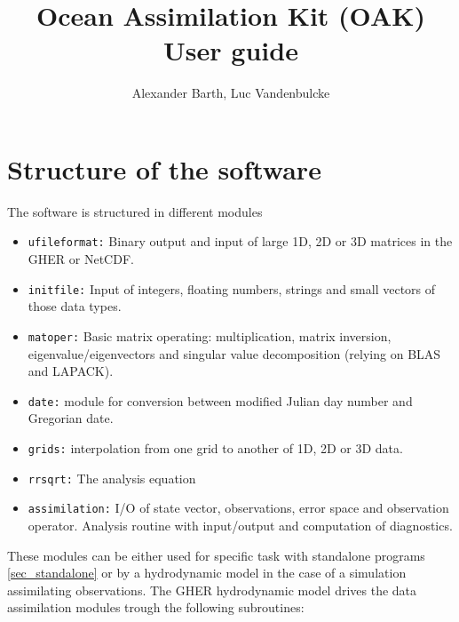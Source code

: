 \documentclass[a4paper,12pt]{article}
\newcommand{\code}{\texttt}
\begin{document}
\setlength{\parindent}{0cm}
\newcommand{\tabularcol}{|p{0.3\textwidth}|p{0.2\textwidth}|p{0.5\textwidth}|}

\title{Ocean Assimilation Kit (OAK) \\ User guide}
\author{Alexander Barth, Luc Vandenbulcke}
\maketitle



\section{Structure of the software}

The software is structured in different modules

\begin{itemize}

\item \code{ufileformat:} Binary output and input of large 1D, 2D or 3D
matrices in the GHER or NetCDF.
\item \code{initfile:} Input of integers, floating numbers, strings and small
vectors of those data types.
\item \code{matoper:} Basic matrix operating: multiplication, matrix
  inversion, eigenvalue/eigenvectors and singular value decomposition
  (relying on BLAS and LAPACK).
\item \code{date:} module for conversion between modified Julian day number
  and Gregorian date.
\item \code{grids:} interpolation from one grid to another of 1D, 2D or
  3D data.
\item \code{rrsqrt:} The analysis equation
\item \code{assimilation:} I/O of state vector, observations, error
  space and observation operator. Analysis routine with input/output
  and computation of diagnostics.
\end{itemize}

These modules can be either used for specific task with standalone programs \ref{sec_standalone} or by a hydrodynamic model
in the case of a simulation assimilating observations. The GHER
hydrodynamic model drives the data assimilation modules trough the
following subroutines:
\end{document}
